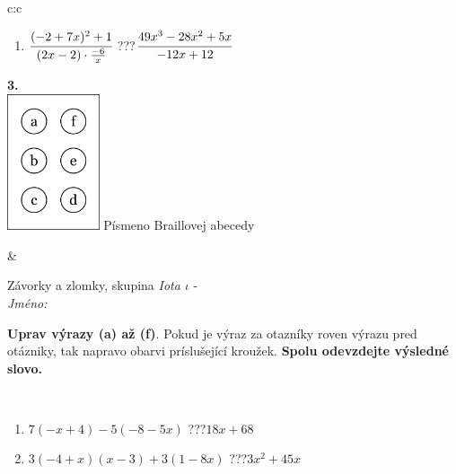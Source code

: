 \documentclass[10pt]{report}
\begin{document}
\begin{tabular}{c:c}
\begin{minipage}[c][104.5mm][t]{0.5\linewidth}
\begin{center}
\begin{minipage}{0.79\linewidth}
\begin{center}
\begin{varwidth}{\linewidth}
\begin{enumerate}
\item $\cfrac{(-2+7x)^2+1}{(2x-2)\cdot\frac{-6}{x}}$\quad \dotfill\; ???\;\dotfill \quad $\cfrac{49x^3-28x^2+5x}{-12x+12}$
\end{enumerate}
\end{varwidth}
\end{center}
\end{minipage}
\begin{minipage}{0.20\linewidth}
\begin{center}
{\Huge\bfseries 3.} \\[2mm]
\includegraphics[height=40mm]{../images/braille.png}
{\small Písmeno Braillovej abecedy}
\end{center}
\end{minipage}
\end{center}
\end{minipage}
&
\begin{minipage}[c][104.5mm][t]{0.5\linewidth}
\begin{center}
\vspace{7mm}
{\huge Závorky a zlomky, skupina \textit{Iota $\iota$} -}\\[5mm]
\textit{Jméno:}\phantom{xxxxxxxxxxxxxxxxxxxxxxxxxxxxxxxxxxxxxxxxxxxxxxxxxxxxxxxxxxxxxxxxx}\\[5mm]
\begin{minipage}{0.95\linewidth}
\begin{center}
\textbf{Uprav výrazy (a) až (f)}. Pokud je výraz za otazníky roven výrazu pred otázniky, tak napravo obarvi príslušející kroužek. \textbf{Spolu odevzdejte výsledné slovo.}
\end{center}
\end{minipage}
\\[1mm]
\begin{minipage}{0.79\linewidth}
\begin{center}
\begin{varwidth}{\linewidth}
\begin{enumerate}
\normalsize
\item $7(-x+4)-5(-8-5x)$\quad \dotfill\; ???\;\dotfill \quad $18x+68$
\item $3(-4+x)(x-3)+3(1-8x)$\quad \dotfill\; ???\;\dotfill \quad $3x^2+45x$

\end{enumerate}
\end{varwidth}
\end{center}
\end{minipage}
\end{center}
\end{minipage}
\end{tabular}
\end{document}
